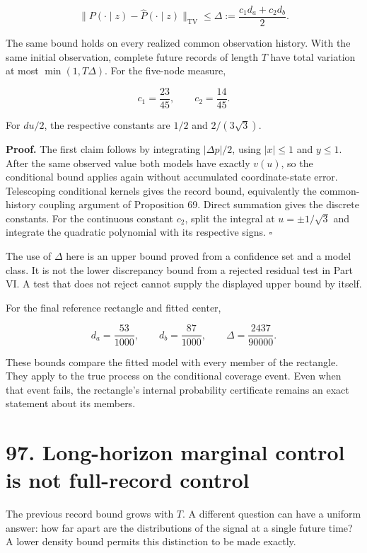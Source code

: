 \documentclass[11pt,letterpaper]{article}
\begin{document}
\[
\boxed{
\|P(\cdot\mid z)-\widehat P(\cdot\mid z)\|_{\mathrm{TV}}
\leq\Delta:=\frac{c_1d_a+c_2d_b}{2}.
}
\]

The same bound holds on every realized common observation history. With
the same initial observation, complete future records of length \(T\)
have total variation at most \(\min(1,T\Delta)\). For the five-node
measure,

\[
c_1=\frac{23}{45},\qquad c_2=\frac{14}{45}.
\]

For \(du/2\), the respective constants are \(1/2\) and \(2/(3\sqrt3)\).

\textbf{Proof.} The first claim follows by integrating \(|\Delta p|/2\),
using \(|x|\leq1\) and \(y\leq1\). After the same observed value both
models have exactly \(v(u)\), so the conditional bound applies again
without accumulated coordinate-state error. Telescoping conditional
kernels gives the record bound, equivalently the common-history coupling
argument of Proposition 69. Direct summation gives the discrete
constants. For the continuous constant \(c_2\), split the integral at
\(u=\pm1/\sqrt3\) and integrate the quadratic polynomial with its
respective signs. \(\square\)

The use of \(\Delta\) here is an upper bound proved from a confidence
set and a model class. It is not the lower discrepancy bound from a
rejected residual test in Part VI. A test that does not reject cannot
supply the displayed upper bound by itself.

For the final reference rectangle and fitted center,

\[
d_a=\frac{53}{1000},\qquad d_b=\frac{87}{1000},
\qquad
\boxed{\Delta=\frac{2437}{90000}.}
\]

These bounds compare the fitted model with every member of the
rectangle. They apply to the true process on the conditional coverage
event. Even when that event fails, the rectangle's internal probability
certificate remains an exact statement about its members.

\section{97. Long-horizon marginal control is not full-record
control}\label{long-horizon-marginal-control-is-not-full-record-control}

The previous record bound grows with \(T\). A different question can
have a uniform answer: how far apart are the distributions of the signal
at a single future time? A lower density bound permits this distinction
to be made exactly.
\end{document}
